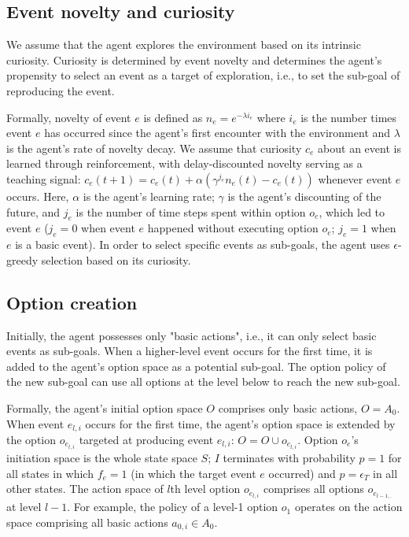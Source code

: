 \documentclass{article}
\begin{document}

\subsection{Event novelty and curiosity}

We assume that the agent explores the environment based on its intrinsic curiosity. Curiosity is determined by event novelty and determines the agent's propensity to select an event as a target of exploration, i.e., to set the sub-goal of reproducing the event.

Formally, novelty of event $e$ is defined as $n_e = e^{-\lambda i_e}$ where $i_e$ is the number times event $e$ has occurred since the agent's first encounter with the environment and $\lambda$ is the agent's rate of novelty decay. We assume that curiosity $c_e$ about an event is learned through reinforcement, with delay-discounted novelty serving as a teaching signal: $c_e(t+1) = c_e(t) + \alpha (\gamma^{j_e} n_e(t) - c_e(t))$ whenever event $e$ occurs. Here, $\alpha$ is the agent's learning rate; $\gamma$ is the agent's discounting of the future, and $j_e$ is the number of time steps spent within option $o_e$, which led to event $e$ ($j_e = 0$ when event $e$ happened without executing option $o_e$; $j_e = 1$ when $e$ is a basic event). In order to select specific events as sub-goals, the agent uses $\epsilon$-greedy selection based on its curiosity.

\subsection{Option creation}

Initially, the agent possesses only "basic actions", i.e., it can only select basic events as sub-goals. When a higher-level event occurs for the first time, it is added to the agent's option space as a potential sub-goal. The option policy of the new sub-goal can use all options at the level below to reach the new sub-goal.

Formally, the agent's initial option space $O$ comprises only basic actions, $O = A_0$. When event $e_{l, i}$ occurs for the first time, the agent's option space is extended by the option $o_{e_{l, i}}$ targeted at producing event $e_{l, i}$: $O = O \cup o_{e_{l, i}}$. Option $o_e$'s initiation space is the whole state space $S$; $I$ terminates with probability $p=1$ for all states in which $f_e = 1$ (in which the target event $e$ occurred) and $p = \epsilon_T$ in all other states. The action space of $l$th level option $o_{e_{l, i}}$ comprises all options $o_{e_{l-1, .}}$ at level $l-1$. For example, the policy of a level-1 option $o_1$ operates on the action space comprising all basic actions $a_{0, i} \in A_0$. 
\end{document}
